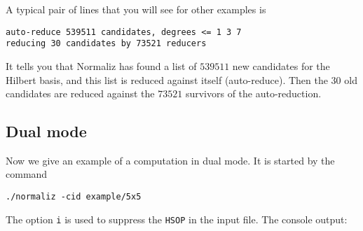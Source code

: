 A typical pair of lines that you will see for other examples is
\begin{Verbatim}
auto-reduce 539511 candidates, degrees <= 1 3 7 
reducing 30 candidates by 73521 reducers
\end{Verbatim}
It tells you that Normaliz has found a list of $539511$ new candidates for the Hilbert basis, and this list is reduced against itself (auto-reduce). Then the $30$ old candidates are reduced against the $73521$ survivors of the auto-reduction.

\subsection{Dual mode}

Now we give an example of a computation in dual mode. It is started by the command
\begin{Verbatim}
./normaliz -cid example/5x5
\end{Verbatim}
The option \verb|i| is used to suppress the \verb|HSOP| in the input file. The console output:

